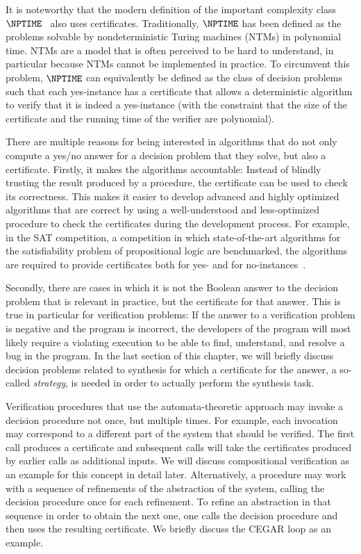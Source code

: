 \documentclass[../../diss.tex]{subfiles}
\begin{document}
It is noteworthy that the modern definition of the important complexity class $\NPTIME$~\cite{Cook00} also uses certificates.
Traditionally, $\NPTIME$ has been defined as the problems solvable by nondeterministic Turing machines (NTMs) in polynomial time.
NTMs are a model that is often perceived to be hard to understand, in particular because NTMs cannot be implemented in practice.
To circumvent this problem, $\NPTIME$ can equivalently be defined as the class of decision problems such that each yes-instance has a certificate that allows a deterministic algorithm to verify that it is indeed a yes-instance (with the constraint that the size of the certificate and the running time of the verifier are polynomial).

There are multiple reasons for being interested in algorithms that do not only compute a yes/no answer for a decision problem that they solve, but also a certificate.
Firstly, it makes the algorithms accountable:
Instead of blindly trusting the result produced by a procedure, the certificate can be used to check its correctness.
This makes it easier to develop advanced and highly optimized algorithms that are correct by using a well-understood and less-optimized procedure to check the certificates during the development process.
For example, in the SAT competition, a competition in which state-of-the-art algorithms for the satisfiability problem of propositional logic are benchmarked, the algorithms are required to provide certificates both for yes- and for no-instances~\cite{Satcomp18}.

Secondly, there are cases in which it is not the Boolean answer to the decision problem that is relevant in practice, but the certificate for that answer.
This is true in particular for verification problems:
If the answer to a verification problem is negative and the program is incorrect, the developers of the program will most likely require a violating execution to be able to find, understand, and resolve a bug in the program.
In the last section of this chapter, we will briefly discuss decision problems related to synthesis for which a certificate for the answer, a so-called \emph{strategy}, is needed in order to actually perform the synthesis task.

Verification procedures that use the automata-theoretic approach may invoke a decision procedure not once, but multiple times.
For example, each invocation may correspond to a different part of the system that should be verified.
The first call produces a certificate and subsequent calls will take the certificates produced by earlier calls as additional inputs.
We will discuss compositional verification as an example for this concept in detail later.
Alternatively, a procedure may work with a sequence of refinements of the abstraction of the system, calling the decision procedure once for each refinement.
To refine an abstraction in that sequence in order to obtain the next one, one calls the decision procedure and then uses the resulting certificate.
We briefly discuss the CEGAR loop as an example.
\end{document}
